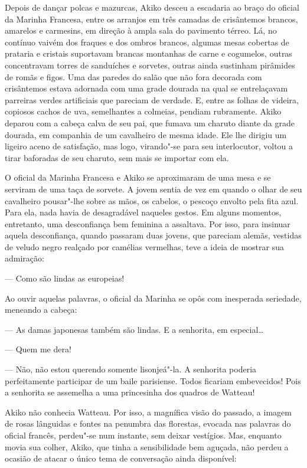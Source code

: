 Depois de dançar polcas e mazurcas, Akiko desceu a escadaria ao braço do
oficial da Marinha Francesa, entre os arranjos em três camadas de
crisântemos brancos, amarelos e carmesins, em direção à ampla sala do
pavimento térreo. Lá, no contínuo vaivém dos fraques e dos ombros		%
brancos, algumas mesas cobertas de prataria e cristais suportavam
brancas montanhas de carne e cogumelos, outras concentravam torres de
sanduíches e sorvetes, outras ainda sustinham pirâmides de romãs e
figos. Uma das paredes do salão que não fora decorada com crisântemos
estava adornada com uma grade dourada na qual se entrelaçavam parreiras
verdes artificiais que pareciam de verdade. E, entre as folhas de
videira, copiosos cachos de uva, semelhantes a colmeias, pendiam
rubramente. Akiko deparou com a cabeça calva de seu pai, que fumava um
charuto diante da grade dourada, em companhia de um cavalheiro de mesma
idade. Ele lhe dirigiu um ligeiro aceno de satisfação, mas logo,
virando"-se para seu interlocutor, voltou a tirar baforadas de seu
charuto, sem mais se importar com ela.

O oficial da Marinha Francesa e Akiko se aproximaram de uma mesa e se
serviram de uma taça de sorvete. A jovem sentia de vez em quando o
olhar de seu cavalheiro pousar"-lhe sobre as mãos, os cabelos, o pescoço
envolto pela fita azul. Para ela, nada havia de desagradável naqueles
gestos. Em alguns momentos, entretanto, uma desconfiança bem feminina a
assaltava. Por isso, para insinuar aquela desconfiança, quando passaram
duas jovens, que pareciam alemãs, vestidas de veludo negro realçado por
camélias vermelhas, teve a ideia de mostrar sua admiração:

--- Como são lindas as europeias!

Ao ouvir aquelas palavras, o oficial da Marinha se opôs com inesperada
seriedade, meneando a cabeça:

--- As damas japonesas também são lindas. E a senhorita, em especial\ldots{}

--- Quem me dera!

--- Não, não estou querendo somente lisonjeá"-la. A senhorita poderia
perfeitamente participar de um baile parisiense. Todos ficariam
embevecidos! Pois a senhorita se assemelha a uma princesinha dos quadros de Watteau!

Akiko não conhecia Watteau. Por isso, a magnífica visão do passado, a
imagem de rosas lânguidas e fontes na penumbra das florestas, evocada
nas palavras do oficial francês, perdeu"-se num instante, sem deixar
vestígios. Mas, enquanto movia sua colher, Akiko, que tinha a
sensibilidade bem aguçada, não perdeu a ocasião de atacar o único tema
de conversação ainda disponível:

